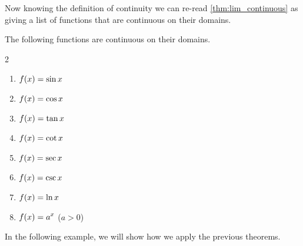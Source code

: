 Now knowing the definition of continuity we can re-read \autoref{thm:lim_continuous} as giving a list of functions that are continuous on their domains.

\begin{theorem}\label{thm:continuous_functions}%
The following functions are continuous on their domains.
\begin{multicols}{2}
 \begin{enumerate}
		\item	$\displaystyle f(x) = \sin x$
		\item	$\displaystyle f(x) = \cos x$
		\item	$\displaystyle f(x) = \tan x$
		\item	$\displaystyle f(x) = \cot x$
		\item	$\displaystyle f(x) = \sec x$
		\item	$\displaystyle f(x) = \csc x$
		\item	$\displaystyle f(x) = \ln x$
		\item	$\displaystyle f(x) = a^x$ ($a>0$)
\end{enumerate}
\end{multicols}
\end{theorem}

In the following example, we will show how we apply the previous theorems.

